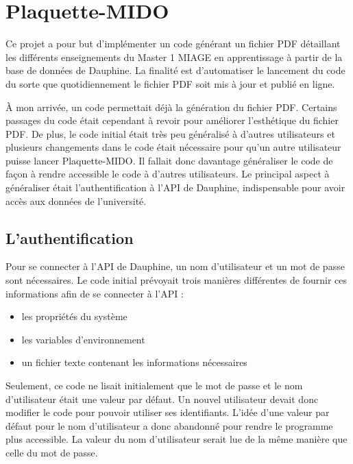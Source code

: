 \chapter[Plaquette-MIDO]{Plaquette-MIDO\raisebox{.3\baselineskip}{\normalsize\footnotemark}}

Ce projet a pour but d'implémenter un code générant un fichier PDF détaillant les différents enseignements du Master 1 MIAGE en apprentissage à partir de la base de données de Dauphine. La finalité est d'automatiser le lancement du code du sorte que quotidiennement le fichier PDF soit mis à jour et publié en ligne.

À mon arrivée, un code permettait déjà la génération du fichier PDF. Certains passages du code était cependant à revoir pour améliorer l'esthétique du fichier PDF. De plus, le code initial était très peu généralisé à d'autres utilisateurs et plusieurs changements dans le code était nécessaire pour qu'un autre utilisateur puisse lancer Plaquette-MIDO. Il fallait donc davantage généraliser le code de façon à rendre accessible le code à d'autres utilisateurs. Le principal aspect à généraliser était l'authentification à l'API de Dauphine, indispensable pour avoir accès aux données de l'université.

\section{L'authentification}

Pour se connecter à l'API de Dauphine, un nom d'utilisateur et un mot de passe sont nécessaires. Le code initial prévoyait trois manières différentes de fournir ces informations afin de se connecter à l'API :
\begin{itemize}
    \item les propriétés du système
    \item les variables d'environnement
    \item un fichier texte contenant les informations nécessaires
\end{itemize}

Seulement, ce code ne lisait initialement que le mot de passe et le nom d'utilisateur était une valeur par défaut. Un nouvel utilisateur devait donc modifier le code pour pouvoir utiliser ses identifiants. L'idée d'une valeur par défaut pour le nom d'utilisateur a donc abandonné pour rendre le programme plus accessible. La valeur du nom d'utilisateur serait lue de la même manière que celle du mot de passe.

